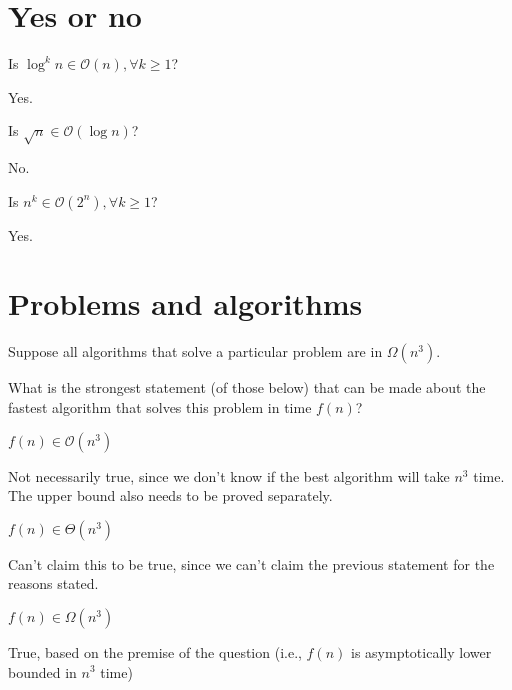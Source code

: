\documentclass[
  coursecode={CISC/CMPE 365},
  assignmentname={Lab 1},
  studentnumber=20053722,
  name={Bryan Hoang}
]{
  ltxanswer%
}
\begin{document}
  \section*{Yes or no}
  \begin{questions}
    \question{}
    Is \(\log^{k}{n} \in \mathcal{O}(n), \forall k \ge 1\)?
    \begin{solution}
      Yes.
    \end{solution}
    \question{}
    Is \(\sqrt{n} \in \mathcal{O}(\log{n})\)?
    \begin{solution}
      No.
    \end{solution}
    \question{}
    Is \(n^{k} \in \mathcal{O}(2^{n}), \forall k \ge 1\)?
    \begin{solution}
      Yes.
    \end{solution}
  \end{questions}

  \section*{Problems and algorithms}
  Suppose all algorithms that solve a particular problem are in \(\Omega(n^{3})\).

  What is the strongest statement (of those below) that can be made about the fastest algorithm that solves this problem in time \(f(n)\)?
  \begin{questions}
    \question{}
    \(f(n) \in \mathcal{O}(n^{3})\)
    \begin{solution}
      Not necessarily true, since we don't know if the best algorithm will take \(n^{3}\) time. The upper bound also needs to be proved separately.
    \end{solution}
    \question{}
    \(f(n) \in \Theta(n^{3})\)
    \begin{solution}
      Can't claim this to be true, since we can't claim the previous statement for the reasons stated.
    \end{solution}
    \question{}
    \(f(n) \in \Omega(n^{3})\)
    \begin{solution}
      True, based on the premise of the question (i.e., \(f(n)\) is asymptotically lower bounded in \(n^{3}\) time)
    \end{solution}
  \end{questions}
\end{document}

